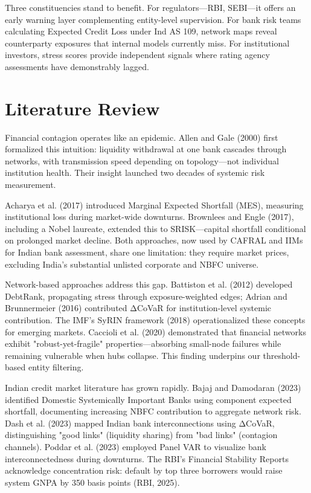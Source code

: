 \documentclass[12pt]{article}
\begin{document}
Three constituencies stand to benefit. For regulators—RBI, SEBI—it offers an early warning layer complementing entity-level supervision. For bank risk teams calculating Expected Credit Loss under Ind AS 109, network maps reveal counterparty exposures that internal models currently miss. For institutional investors, stress scores provide independent signals where rating agency assessments have demonstrably lagged.

\section*{Literature Review}

Financial contagion operates like an epidemic. Allen and Gale (2000) first formalized this intuition: liquidity withdrawal at one bank cascades through networks, with transmission speed depending on topology—not individual institution health. Their insight launched two decades of systemic risk measurement.

Acharya et al. (2017) introduced Marginal Expected Shortfall (MES), measuring institutional loss during market-wide downturns. Brownlees and Engle (2017), including a Nobel laureate, extended this to SRISK—capital shortfall conditional on prolonged market decline. Both approaches, now used by CAFRAL and IIMs for Indian bank assessment, share one limitation: they require market prices, excluding India's substantial unlisted corporate and NBFC universe.

Network-based approaches address this gap. Battiston et al. (2012) developed DebtRank, propagating stress through exposure-weighted edges; Adrian and Brunnermeier (2016) contributed ΔCoVaR for institution-level systemic contribution. The IMF's SyRIN framework (2018) operationalized these concepts for emerging markets. Caccioli et al. (2020) demonstrated that financial networks exhibit "robust-yet-fragile" properties—absorbing small-node failures while remaining vulnerable when hubs collapse. This finding underpins our threshold-based entity filtering.

Indian credit market literature has grown rapidly. Bajaj and Damodaran (2023) identified Domestic Systemically Important Banks using component expected shortfall, documenting increasing NBFC contribution to aggregate network risk. Dash et al. (2023) mapped Indian bank interconnections using ΔCoVaR, distinguishing "good links" (liquidity sharing) from "bad links" (contagion channels). Poddar et al. (2023) employed Panel VAR to visualize bank interconnectedness during downturns. The RBI's Financial Stability Reports acknowledge concentration risk: default by top three borrowers would raise system GNPA by 350 basis points (RBI, 2025).
\end{document}
